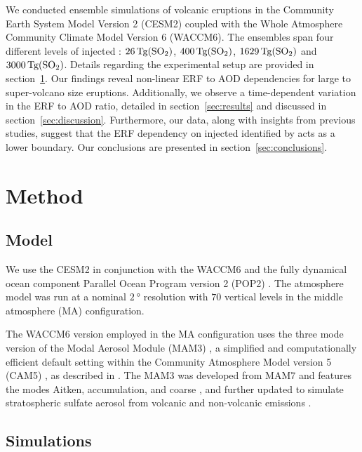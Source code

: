 \documentclass[draft]{agujournal2019}
\begin{document}
  We conducted ensemble simulations of volcanic eruptions in the Community Earth System
  Model Version 2 (CESM2) coupled with the Whole Atmosphere Community Climate Model
  Version 6 (WACCM6). The ensembles span four different levels of injected :
  \(\SI{26}{\tera\gram(\ce{SO2})}\), \(\SI{400}{\tera\gram(\ce{SO2})}\),
  \(\SI{1629}{\tera\gram(\ce{SO2})}\) and \(\SI{3000}{\tera\gram(\ce{SO2})}\). Details
  regarding the experimental setup are provided in section~\ref{sec:method}. Our
  findings reveal non-linear ERF to AOD dependencies for large to super-volcano size
  eruptions. Additionally, we observe a time-dependent variation in the ERF to AOD
  ratio, detailed in section~\ref{sec:results} and discussed in
  section~\ref{sec:discussion}. Furthermore, our data, along with insights from previous
  studies, suggest that the ERF dependency on injected  identified by
   acts as a lower boundary. Our conclusions are presented in
  section~\ref{sec:conclusions}.

  \section{Method}

  \label{sec:method}

  \subsection{Model}

  We use the CESM2 \cite{danabasoglu2020} in conjunction with the WACCM6
  \cite{gettleman2019} and the fully dynamical ocean component Parallel Ocean Program
  version 2 (POP2) \cite{smith2010, danabasoglu2020}. The atmosphere model was run at a
  nominal \(\SI{2}{\degree}\) resolution with \(70\) vertical levels in the middle
  atmosphere (MA) configuration.

  The WACCM6 version employed in the MA configuration uses the three mode version of the
  Modal Aerosol Module (MAM3) \cite{gettleman2019}, a simplified and computationally
  efficient default setting within the Community Atmosphere Model version 5 (CAM5)
  \cite{liu2016}, as described in . The MAM3 was developed from MAM7 and
  features the modes Aitken, accumulation, and coarse \cite{liu2016}, and further
  updated to simulate stratospheric sulfate aerosol from volcanic and non-volcanic
  emissions \cite{mills2016}.

  \subsection{Simulations}
\end{document}
